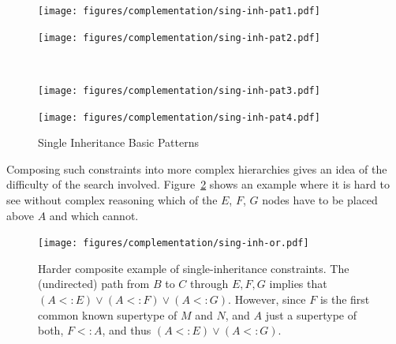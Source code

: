 \begin{figure}[th!b]
  \vspace{-5mm}
  \begin{minipage}[t]{0.5\linewidth}
    \centering
    \texttt{[image: figures/complementation/sing-inh-pat1.pdf]}
    \label{hiercomp/fig:single1}
  \end{minipage}
  \hspace{0.4in}
  \begin{minipage}[t]{0.5\linewidth}
    \centering
    \texttt{[image: figures/complementation/sing-inh-pat2.pdf]}
    \label{hiercomp/fig:single2}
  \end{minipage}
  \\
  \begin{minipage}[t]{0.5\linewidth}
    \centering
    \texttt{[image: figures/complementation/sing-inh-pat3.pdf]}
    \label{hiercomp/fig:single3}
  \end{minipage}
  \hspace{0.2in}
  \begin{minipage}[t]{0.5\linewidth}
    \centering
    \texttt{[image: figures/complementation/sing-inh-pat4.pdf]}
    \label{hiercomp/fig:single4}
  \end{minipage}
  \caption{Single Inheritance Basic Patterns}
\end{figure}

Composing such constraints into more complex hierarchies gives an idea
of the difficulty of the search involved. Figure~\ref{hiercomp/fig:hard:or}
shows an example where it is hard to see without complex
reasoning which of the $E$, $F$, $G$ nodes have to be placed
above $A$ and which cannot.

\begin{figure}
  \centering
  \texttt{[image: figures/complementation/sing-inh-or.pdf]}
  \caption[Harder composite example of single-inheritance
  constraints]{ Harder composite example of single-inheritance
    constraints.  The (undirected) path from $B$ to $C$ through
    $E,F,G$ implies that $(A <: E) \lor (A <: F) \lor (A <:
    G)$. However, since $F$ is the first common known supertype of $M$
    and $N$, and $A$ just a supertype of both, $F <: A$, and thus
    $(A <: E) \lor (A <: G)$. }
\label{hiercomp/fig:hard:or}
\end{figure}

